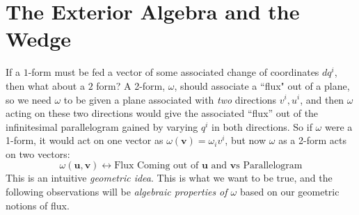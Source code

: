 \documentclass[../master.tex]{subfiles}
\begin{document}
	
	
	
	\section{The Exterior Algebra and the Wedge} %
	\label{sec:the_exterior_algebra_and_the_wedge}
	
	If a $1$-form must be fed a vector of some associated change of coordinates $dq^i$, then what about a $2$ form? A 2-form, $\omega$, should associate a ``flux" out of a plane, so we need $\omega$ to be given a plane associated with \emph{two} directions $v^i, u^i$, and then $\omega$ acting on these two directions would give the associated ``flux'' out of the infinitesimal parallelogram gained by varying $q^i$ in both directions. So if $\omega$ were a 1-form, it would act on one vector as $\omega(\mathbf v)=\omega_i v^i$, but now $\omega$ as a 2-form acts on two vectors:
	\begin{equation*}
		\omega(\mathbf u, \mathbf v) \longleftrightarrow \text{Flux Coming out of $\mathbf u$ and $\mathbf v$s Parallelogram}
	\end{equation*}
	This is an intuitive \emph{geometric idea}. This is what we want to be true, and the following observations will be \emph{algebraic properties of $\omega$} based on our geometric notions of flux.\\
\end{document}
